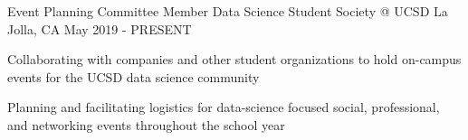 
\begin{cventries}
  \cventry
    {Event Planning Committee Member} %
    {Data Science Student Society @ UCSD} %
    {La Jolla, CA} %
    {May 2019 - PRESENT} %
    {
      \begin{cvitems} %
        \item {Collaborating with companies and other student organizations to hold on-campus events for the UCSD data science community}
        \item {Planning and facilitating logistics for data-science focused social, professional, and networking events throughout the school year}
      \end{cvitems}
    }
   
\end{cventries}
